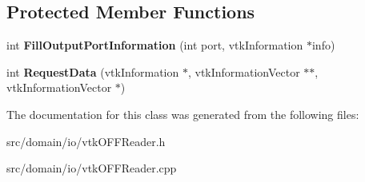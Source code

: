 \subsection*{Protected Member Functions}
\begin{DoxyCompactItemize}
\item 
\hypertarget{classvtk_o_f_f_reader_a51e5fbde1c03a56679fe18d61351d088}{}int {\bfseries Fill\+Output\+Port\+Information} (int port, vtk\+Information $\ast$info)\label{classvtk_o_f_f_reader_a51e5fbde1c03a56679fe18d61351d088}

\item 
\hypertarget{classvtk_o_f_f_reader_a15f89f432f390ef058f61ba033c96116}{}int {\bfseries Request\+Data} (vtk\+Information $\ast$, vtk\+Information\+Vector $\ast$$\ast$, vtk\+Information\+Vector $\ast$)\label{classvtk_o_f_f_reader_a15f89f432f390ef058f61ba033c96116}

\end{DoxyCompactItemize}


The documentation for this class was generated from the following files\+:\begin{DoxyCompactItemize}
\item 
src/domain/io/vtk\+O\+F\+F\+Reader.\+h\item 
src/domain/io/vtk\+O\+F\+F\+Reader.\+cpp\end{DoxyCompactItemize}
